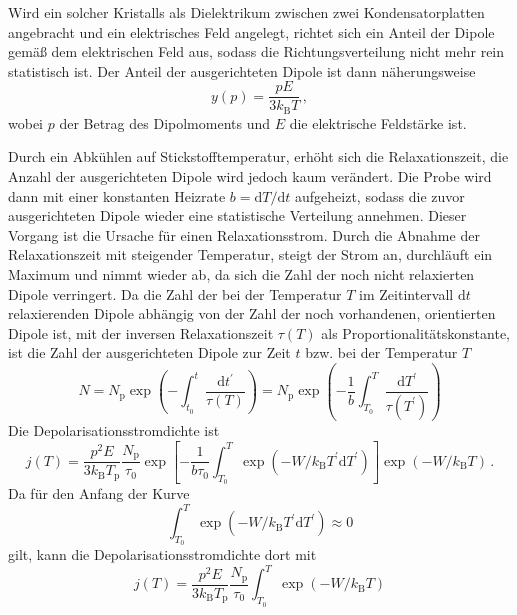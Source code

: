 Wird ein solcher Kristalls als Dielektrikum zwischen zwei Kondensatorplatten angebracht und ein elektrisches Feld angelegt, richtet sich ein Anteil der Dipole gemäß dem elektrischen Feld aus, sodass die Richtungsverteilung nicht mehr rein statistisch ist. Der Anteil der ausgerichteten Dipole ist dann näherungsweise
\begin{equation}
  y(p) = \frac{pE}{3k_\text{B}T}\,,
\end{equation}
wobei $p$ der Betrag des Dipolmoments und $E$ die elektrische Feldstärke ist.\par
Durch ein Abkühlen auf Stickstofftemperatur, erhöht sich die Relaxationszeit, die Anzahl der ausgerichteten Dipole wird jedoch kaum verändert. Die Probe wird dann mit einer konstanten Heizrate $b = \text{d}T/\text{d}t$ aufgeheizt, sodass die zuvor ausgerichteten Dipole wieder eine statistische Verteilung annehmen. Dieser Vorgang ist die Ursache für einen Relaxationsstrom. Durch die Abnahme der Relaxationszeit mit steigender Temperatur, steigt der Strom an, durchläuft ein Maximum und nimmt wieder ab, da sich die Zahl der noch nicht relaxierten Dipole verringert.
Da die Zahl der bei der Temperatur $T$ im Zeitintervall $\text{d}t$ relaxierenden Dipole abhängig von der Zahl der noch vorhandenen, orientierten Dipole ist, mit der inversen Relaxationszeit $\tau(T)$ als Proportionalitätskonstante, ist die Zahl der ausgerichteten Dipole zur Zeit $t$ bzw. bei der Temperatur $T$
\begin{equation}
  N = N_\text{p} \exp{\left( - \int_{t_0}^{t} \frac{\text{d}t^\prime}{\tau(T)} \right)} = N_\text{p} \exp{\left( - \frac{1}{b} \int_{T_0}^{T} \frac{\text{d}T^\prime}{\tau(T^\prime)} \right)}
\end{equation}
Die Depolarisationsstromdichte ist
\begin{equation}
  j(T) = \frac{p^2E}{3k_\text{B}T_\text{p}} \frac{N_\text{p}}{\tau_0} \exp{\left[ -\frac{1}{b\tau_0}\int_{T_0}^{T} \exp{\left( -W / k_\text{B}T^\prime \text{d}T^\prime \right)} \right]} \exp{\left( -W / k_\text{B}T \right)}\,.
  \label{eq:stromdichte}
\end{equation}
Da für den Anfang der Kurve
\begin{equation}
  \int_{T_0}^{T} \exp{\left( -W / k_\text{B}T^\prime \text{d}T^\prime \right)} \approx 0
\end{equation}
gilt, kann die Depolarisationsstromdichte dort mit
\begin{equation}
  j(T) = \frac{p^2E}{3k_\text{B}T_\text{p}} \frac{N_\text{p}}{\tau_0} \int_{T_0}^{T} \exp{\left( -W / k_\text{B}T \right)}
  \label{eq:meth1}
\end{equation}
